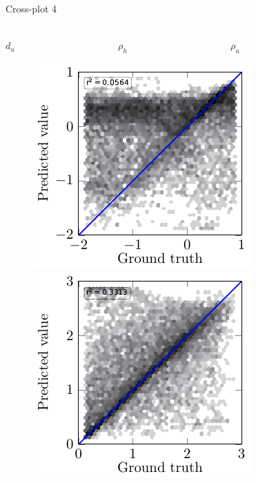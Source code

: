 \begin{frame}{Cross-plot 4}
\centering
\setlength{\fboxrule}{0.5mm}
\setlength{\fboxsep}{1mm}
\color{red}
\color{black}

$\qquad$ \\
\hspace{0.5cm} $d_u$ $\qquad \qquad \qquad \qquad \qquad$ $\rho_h$ $\qquad \qquad \qquad \qquad \qquad$ $\rho_u$
\begin{figure}[!h]
\centering
	{%
		\includegraphics[scale=0.8]{Diapos/DL_For_Inv/Figures/Syn_example/Cross_plots/Two_Step_loss/C_P_4/d_u.pdf}
		\hspace{0.1cm}
		\includegraphics[scale=0.8]{Diapos/DL_For_Inv/Figures/Syn_example/Cross_plots/Two_Step_loss/C_P_4/rho_h.pdf}
}
\end{figure}
\end{frame}
